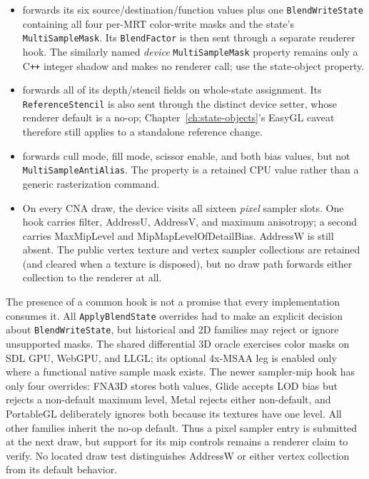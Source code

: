 \begin{itemize}
  \item {} forwards its six source/destination/function values plus one
    \texttt{BlendWriteState} containing all four per-MRT color-write masks and the state's
    \texttt{MultiSampleMask}. Its \texttt{BlendFactor} is then sent through a separate renderer
    hook. The similarly named \emph{device} \texttt{MultiSampleMask} property remains only a
    C\texttt{++} integer shadow and makes no renderer call; use the state-object property.
  \item {} forwards all of its depth/stencil fields on whole-state
    assignment. Its \texttt{ReferenceStencil} is also sent through the distinct device setter,
    whose renderer default is a no-op; Chapter~\ref{ch:state-objects}'s EasyGL caveat therefore
    still applies to a standalone reference change.
  \item {} forwards cull mode, fill mode, scissor enable, and both bias
    values, but not \texttt{MultiSampleAntiAlias}. The property is a retained CPU value rather
    than a generic rasterization command.
  \item On every CNA draw, the device visits all sixteen \emph{pixel} sampler slots. One hook
    carries filter, AddressU, AddressV, and maximum anisotropy; a second carries MaxMipLevel and
    MipMapLevelOfDetailBias. AddressW is still absent. The public vertex texture and vertex
    sampler collections are retained (and cleared when a texture is disposed), but no draw path
    forwards either collection to the renderer at all.
\end{itemize}

The presence of a common hook is not a promise that every implementation consumes it. All
\texttt{ApplyBlendState} overrides had to make an explicit decision about
\texttt{BlendWriteState}, but historical and 2D families may reject or ignore unsupported masks.
The shared differential 3D oracle exercises color masks on SDL GPU, WebGPU, and LLGL; its optional
4x-MSAA leg is enabled only where a functional native sample mask exists. The newer sampler-mip
hook has only four overrides: FNA3D stores both values, Glide accepts LOD bias but rejects a
non-default maximum level, Metal rejects either non-default, and PortableGL deliberately ignores
both because its textures have one level. All other families inherit the no-op default. Thus a
pixel sampler entry is submitted at the next draw, but support for its mip controls remains a
renderer claim to verify. No located draw test distinguishes AddressW or either vertex collection
from its default behavior.

